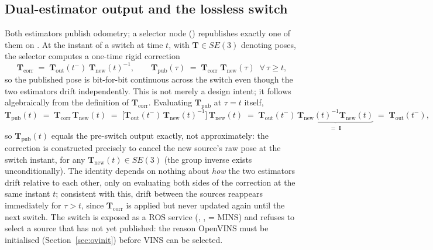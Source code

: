 \subsection{Dual-estimator output and the lossless switch}
Both estimators publish odometry; a selector node ()
republishes exactly one of them on . At the instant
of a switch at time $t$, with $\mathbf{T} \in SE(3)$ denoting poses, the
selector computes a one-time rigid correction
\begin{equation}
\mathbf{T}_{\mathrm{corr}} \;=\;
\mathbf{T}_{\mathrm{out}}(t^-)\;
\mathbf{T}_{\mathrm{new}}(t)^{-1},
\qquad
\mathbf{T}_{\mathrm{pub}}(\tau) \;=\;
\mathbf{T}_{\mathrm{corr}}\;
\mathbf{T}_{\mathrm{new}}(\tau)\;\;\forall\,\tau \ge t,
\label{eq:se3}
\end{equation}
so the published pose is bit-for-bit continuous across the switch even though
the two estimators drift independently. This is not merely a design intent;
it follows algebraically from the definition of $\mathbf{T}_{\mathrm{corr}}$.
Evaluating $\mathbf{T}_{\mathrm{pub}}$ at $\tau = t$ itself,
\begin{equation}
\mathbf{T}_{\mathrm{pub}}(t)
\;=\; \mathbf{T}_{\mathrm{corr}}\,\mathbf{T}_{\mathrm{new}}(t)
\;=\; \big[\mathbf{T}_{\mathrm{out}}(t^-)\,\mathbf{T}_{\mathrm{new}}(t)^{-1}\big]\,
\mathbf{T}_{\mathrm{new}}(t)
\;=\; \mathbf{T}_{\mathrm{out}}(t^-)\,
\underbrace{\mathbf{T}_{\mathrm{new}}(t)^{-1}\mathbf{T}_{\mathrm{new}}(t)}_{=\;\mathbf{I}}
\;=\; \mathbf{T}_{\mathrm{out}}(t^-),
\end{equation}
so $\mathbf{T}_{\mathrm{pub}}(t)$ equals the pre-switch output exactly, not
approximately: the correction is constructed precisely to cancel the new
source's raw pose at the switch instant, for any $\mathbf{T}_{\mathrm{new}}(t) \in
SE(3)$ (the group inverse exists unconditionally). The identity depends on
nothing about \emph{how} the two estimators drift relative to each other,
only on evaluating both sides of the correction at the same instant $t$;
consistent with this, drift between the sources reappears immediately for
$\tau > t$, since $\mathbf{T}_{\mathrm{corr}}$ is applied but never updated
again until the next switch. The switch is exposed as a ROS service
(, ,  =
MINS) and refuses to select a source that has not yet published: the reason
OpenVINS must be initialised (Section~\ref{sec:ovinit}) before VINS can be
selected.

